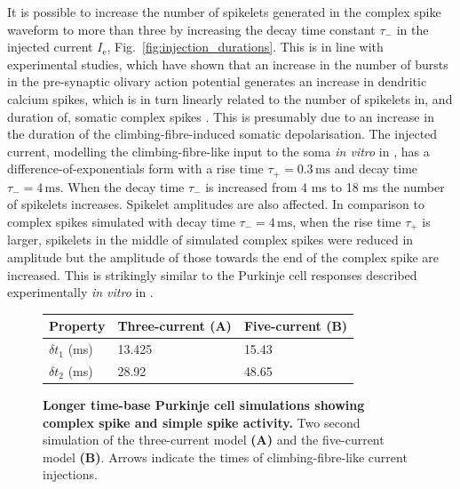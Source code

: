 \documentclass[twocolumn]{svjour3}          %
\newcommand{\mse}{\,\mathrm{ms}}
\begin{document}
It is possible to increase the number of spikelets generated in the
complex spike waveform to more than three by increasing the decay time
constant $\tau_-$ in the injected current $I_{\mathrm{e}}$,
Fig.~\ref{fig:injection_durations}. This is in line with experimental
studies, which have shown that an increase in the number of bursts in
the pre-synaptic olivary action potential generates an increase in
dendritic calcium spikes, which is in turn linearly related to the
number of spikelets in, and duration of, somatic complex spikes
\citep{MathyEtAl2009}. This is presumably due to an increase in the
duration of the climbing-fibre-induced somatic depolarisation.  The
injected current, modelling the climbing-fibre-like input to the soma
\textsl{in vitro} in \citet{DavieEtAl2008}, has a
difference-of-exponentials form with a rise time $\tau_+=0.3\mse$ and
decay time $\tau_-=4\mse$. When the decay time $\tau_-$ is increased
from 4 ms to 18 ms the number of spikelets increases. Spikelet
amplitudes are also affected. In comparison to complex spikes
simulated with decay time $\tau_- = 4\mse$, when the rise time
$\tau_+$ is larger, spikelets in the middle of simulated complex
spikes were reduced in amplitude but the amplitude of those towards
the end of the complex spike are increased.  This is strikingly
similar to the Purkinje cell responses described experimentally
\textsl{in vitro} in \citet{MonsivaisEtAl2005}.


\begin{figure}[!ht]

\caption{\textbf{Longer time-base Purkinje cell simulations showing
    complex spike and simple spike activity.} Two second simulation of
  the three-current model \textbf{(A)} and the five-current model
    \textbf{(B)}. Arrows indicate the times of climbing-fibre-like
    current injections.
}
  \begin{center}
    \begin{tabular}{|l l l|}
      \hline
      Property & Three-current (\textbf{A}) & Five-current (\textbf{B})\\ \hline
      $\delta t_1$ (ms)& 13.425&15.43\\
      $\delta t_2$ (ms)&28.92&48.65\\
      \hline
    \end{tabular}
    \end{center}
\label{fig:long_time_base}
\end{figure}
\end{document}
